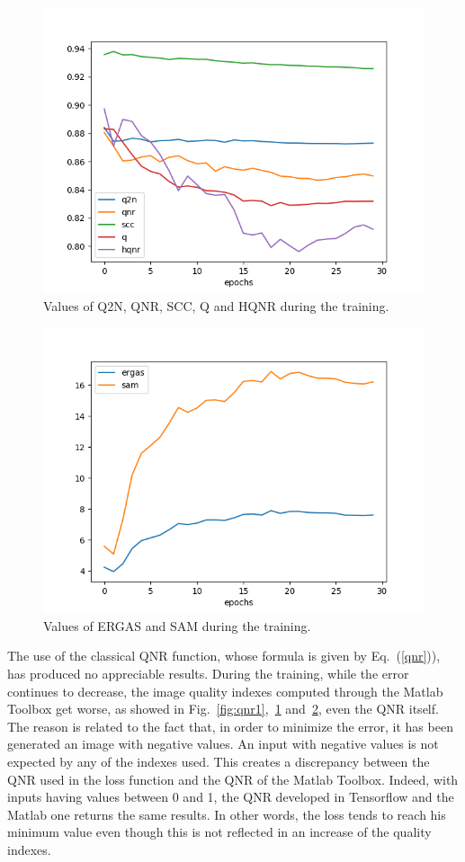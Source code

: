 \documentclass[12pt]{report}
\begin{document}
\begin{figure}
    \centering
    \includegraphics[scale=.7]{qnr2.png}
    \caption{Values of Q2N, QNR, SCC, Q and HQNR during the training.}
    \label{fig:qnr2}
\end{figure}


\begin{figure}
    \centering
    \includegraphics[scale=.7]{qnr3.png}
    \caption{Values of ERGAS and SAM during the training.}
    \label{fig:qnr3}
\end{figure}

The use of the classical QNR function, whose formula is given by Eq.~(\ref{qnr})), has produced no appreciable results.
During the training, while the error continues to decrease, the image quality indexes computed through the Matlab Toolbox get worse, as showed in Fig.~\ref{fig:qnr1},~\ref{fig:qnr2} and~\ref{fig:qnr3}, even the QNR itself.
The reason is related to the fact that, in order to minimize the error, it has been generated an image with negative values.
An input with negative values is not expected by any of the indexes used.
This creates a discrepancy between the QNR used in the loss function and the QNR of the Matlab Toolbox.
Indeed, with inputs having values between 0 and 1, the QNR developed in Tensorflow and the Matlab one returns the same results.
In other words, the loss tends to reach his minimum value even though this is not reflected in an increase of the quality indexes. 
\end{document}
